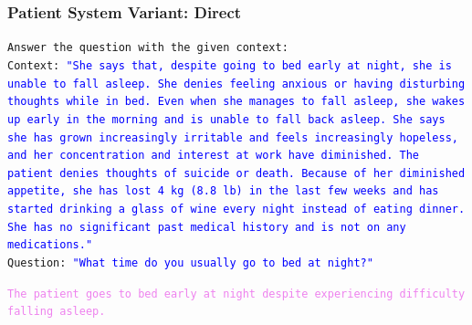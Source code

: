 \subsubsection{Patient System Variant: Direct}\label{app:patient_baseline_prompt}
\begin{tcolorbox}[title={Prompt to LLM}, colframe=gray]
\small\texttt{Answer the question with the given context:\\
Context: \textcolor{blue}{"She says that, despite going to bed early at night, she is unable to fall asleep. She denies feeling anxious or having disturbing thoughts while in bed. Even when she manages to fall asleep, she wakes up early in the morning and is unable to fall back asleep. She says she has grown increasingly irritable and feels increasingly hopeless, and her concentration and interest at work have diminished. The patient denies thoughts of suicide or death. Because of her diminished appetite, she has lost 4 kg (8.8 lb) in the last few weeks and has started drinking a glass of wine every night instead of eating dinner. She has no significant past medical history and is not on any medications."}\\
Question: \textcolor{blue}{"What time do you usually go to bed at night?"}}\normalsize
\end{tcolorbox}

\begin{tcolorbox}[title={Example LLM Output}, colframe=gray]
\small\texttt{\textcolor{violet}{The patient goes to bed early at night despite experiencing difficulty falling asleep.}}\normalsize
\end{tcolorbox}

